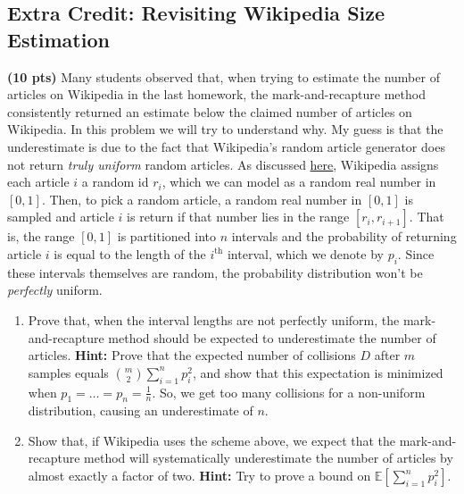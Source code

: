\documentclass[10pt]{article}
\newcommand{\E}{\mathbb{E}}
\begin{document}
\subsection{Extra Credit: Revisiting Wikipedia Size Estimation}\textbf{(10 pts)} 
Many students observed that, when trying to estimate the number of articles on Wikipedia in the last homework, the mark-and-recapture method consistently returned an estimate below the claimed number of articles on Wikipedia. In this problem we will try to understand why. My guess is that the underestimate is due to the fact that 
Wikipedia's random article generator does not return \emph{truly uniform} random articles. As discussed \href{https://en.wikipedia.org/wiki/Wikipedia:FAQ/Technical#random}{here}, Wikipedia assigns each article $i$ a random id $r_i$, which we can model as a random real number in $[0, 1]$. Then, to pick a random article, a random real number in $[0, 1]$ is sampled and article $i$ is return if that number lies in the range $[r_i, r_{i+1}].$ That is, the range $[0, 1]$ is partitioned into $n$ intervals and the probability of returning article $i$ is equal to the length of the $i^\text{th}$ interval, which we denote by $p_i$. Since these intervals themselves are random, the probability distribution won't be \emph{perfectly} uniform.
\begin{enumerate}
	\item Prove that, when the interval lengths are not perfectly uniform, the mark-and-recapture method should be expected to underestimate the number of articles. \textbf{Hint:} Prove that the expected number of collisions $D$ after $m$ samples equals $\binom{m}{2}\sum_{i=1}^n p_i^2$, and show that this expectation is minimized when $p_1 = \ldots = p_n = \frac{1}{n}$.  So, we get too many collisions for a non-uniform distribution, causing an underestimate of $n$.
	\item Show that, if Wikipedia uses the scheme above, we expect that the mark-and-recapture method will systematically underestimate the number of articles by almost exactly a factor of two. \textbf{Hint:} Try to prove a bound on $\E\left[\sum_{i=1}^n p_i^2\right]$. 
\end{enumerate}
\end{document}
